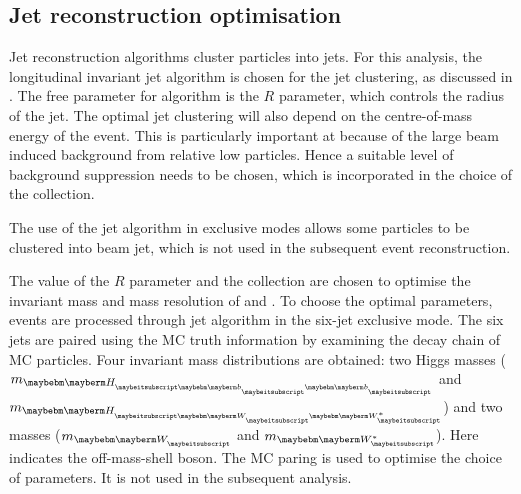 \subsection{Jet reconstruction optimisation}
\label{sec:doubleHiggsJetOptimisation}

Jet reconstruction algorithms cluster particles into jets. For this analysis, the longitudinal invariant \kt jet algorithm is chosen for the jet clustering, as discussed in . The free parameter for \kt algorithm is the $R$ parameter, which controls the radius of the jet. The optimal jet clustering will also depend on the centre-of-mass energy of the event. This is particularly important at \CLIC because of the large beam induced background from relative low  \pT particles. Hence a suitable level of background suppression needs to be chosen, which is incorporated in the choice of the \PFO  collection.


The use of the \kt jet algorithm in exclusive modes allows some particles to be clustered into beam jet, which is not used in the subsequent event reconstruction.

The value of the $R$ parameter and the \PFO collection are chosen to optimise the invariant mass and mass resolution of \PHiggs and \PW. To choose the optimal parameters, \eeToHHbbWWHad events  are processed through \kt jet algorithm  in the six-jet exclusive mode. The six jets are paired using the MC truth information by examining the decay chain of MC particles. Four invariant mass distributions are obtained: two Higgs masses ($m_{\Hbb}$ and $m_{\HWW}$) and two \PW masses ($m_{\PW}$ and $m_{\W*}$). Here \W* indicates the off-mass-shell \PW boson. The MC paring is used to optimise the choice of parameters. It is not used in the subsequent analysis.



